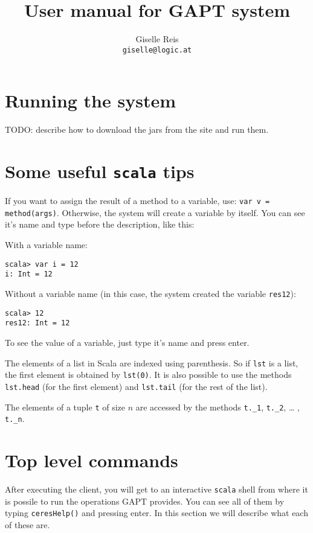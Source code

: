 \documentclass[a4paper, 11pt]{article}
\title{User manual for GAPT system}
\author{Giselle Reis \\ \texttt{giselle@logic.at}}
\begin{document}
\maketitle

\section{Running the system}

TODO: describe how to download the jars from the site and run them.

\section{Some useful \texttt{scala} tips}

If you want to assign the result of a method to a variable, use: 
\texttt{var v = method(args)}. Otherwise, the system will create a variable by 
itself. You can see it's name and type before the description, like this:

With a variable name:
\begin{lstlisting}
scala> var i = 12
i: Int = 12
\end{lstlisting}

Without a variable name (in this case, the system created the variable \texttt{res12}):
\begin{lstlisting}
scala> 12
res12: Int = 12
\end{lstlisting}

To see the value of a variable, just type it’s name and press enter.

The elements of a list in Scala are indexed using parenthesis. So if \texttt{lst} 
is a list, the first element is obtained by \texttt{lst(0)}. It is also possible 
to use the methods \texttt{lst.head} (for the first element) and \texttt{lst.tail} 
(for the rest of the list).

The elements of a tuple \texttt{t} of size $n$ are accessed by the methods 
\texttt{t.\_1}, \texttt{t.\_2}, … , \texttt{t.\_n}.

\section{Top level commands}

After executing the client, you will get to an interactive \texttt{scala} shell 
from where it is possile to run the operations GAPT provides. You can see all of
them by typing \texttt{ceresHelp()} and pressing enter. In this section we will 
describe what each of these are.
\end{document}
